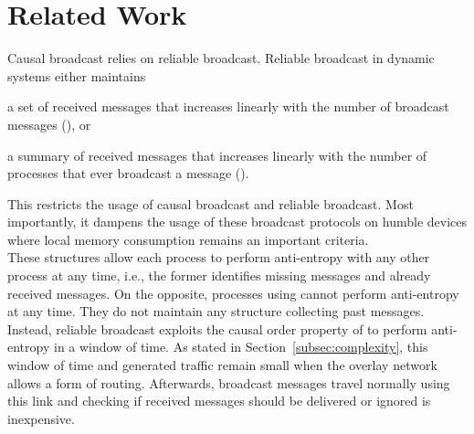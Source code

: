 
\section{Related Work}
\label{sec:relatedwork}




Causal broadcast relies on reliable broadcast. Reliable broadcast in dynamic
systems either maintains
\begin{inparaenum}[(i)]
\item a set of received messages that increases linearly with the number of
  broadcast messages (\REF), or
\item a summary of received messages that increases linearly with the number of
  processes that ever broadcast a message (\REF). 
\end{inparaenum}
This restricts the usage of causal broadcast and reliable broadcast. Most
importantly, it dampens the usage of these broadcast protocols on humble devices
where local memory consumption remains an important criteria. \\
These structures allow each process to perform anti-entropy with any other
process at any time, i.e., the former identifies missing messages and already
received messages. On the opposite, processes using \RPCBROADCAST cannot perform
anti-entropy at any time. They do not maintain any structure collecting past
messages. Instead, reliable broadcast exploits the causal order property of
\RPCBROADCAST to perform anti-entropy in a window of time. As stated in
Section~\ref{subsec:complexity}, this window of time and generated traffic
remain small when the overlay network allows a form of routing. Afterwards,
broadcast messages travel normally using this link and checking if received
messages should be delivered or ignored is inexpensive.



